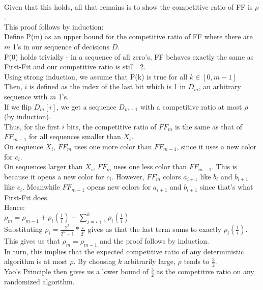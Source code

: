 \\Given that this holds, all that remains is to show the competitive ratio of FF is $\rho$. 
\\This proof follows by induction:
\\Define P(m) as an upper bound for the competitive ratio of FF where there are $m$ 1's in our sequence of decisions $D$.
\\P(0) holds trivially - in a sequence of all zero's, FF behaves exactly the same as First-Fit and our competitive ratio is still ~2.
\\Using strong induction, we assume that P(k) is true for all $k \in [0,m-1]$
\\Then, $i$ is defined as the index of the last bit which is 1 in $D_m$, an arbitrary sequence with $m$ 1's.
\\If we flip $D_m[i]$, we get a sequence $D_{m-1}$ with a competitive ratio at most $\rho$ (by induction).
\\Thus, for the first $i$ bits, the competitive ratio of $FF_m$ is the same as that of $FF_{m-1}$ for all sequences smaller than $X_i$. 
\\On sequence $X_i$, $FF_m$ uses one more color than $FF_{m-1}$, since it uses a new color for $c_i$.
\\On sequences larger than $X_i$, $FF_m$ uses one less color than $FF_{m-1}$. This is because it opens a new color for $c_i$. However, $FF_m$ colors $a_{i+1}$ like $b_i$ and $b_{i+1}$ like $c_i$. Meanwhile $FF_{m-1}$ opens new colors for $a_{i+1}$ and $b_{i+1}$ since that's what First-Fit does. 
\\Hence:
\\$\rho_m = \rho_{m-1} + \rho_i(\frac{1}{i}) - \sum_{j=i+1}^k \rho_i(\frac{1}{i})$
\\Substituting $\rho_i = \frac{2^k}{2^k-1}*\frac{i}{2^i}$ gives us that the last term sums to exactly $\rho_i(\frac{1}{i})$.
\\This gives us that $\rho_m = \rho_{m-1}$ and the proof follows by induction.
\\In turn, this implies that the expected competitive ratio of any deterministic algorithm is at most $\rho$. By choosing $k$ arbitrarily large, $\rho$ tends to $\frac{3}{2}$. 
\\Yao's Principle then gives us a lower bound of $\frac{3}{2}$ as the competitive ratio on any randomized algorithm.
